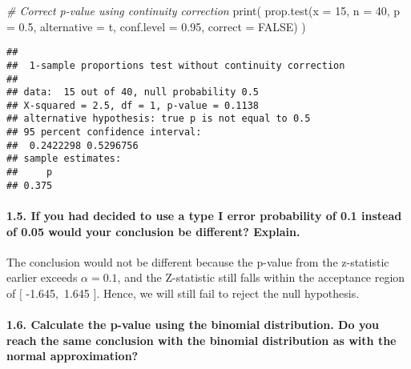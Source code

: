 \documentclass[
]{article}
\newenvironment{Shaded}{\begin{snugshade}}{\end{snugshade}}
\newcommand{\AttributeTok}[1]{\textcolor[rgb]{0.77,0.63,0.00}{#1}}
\newcommand{\CommentTok}[1]{\textcolor[rgb]{0.56,0.35,0.01}{\textit{#1}}}
\newcommand{\ConstantTok}[1]{\textcolor[rgb]{0.00,0.00,0.00}{#1}}
\newcommand{\DecValTok}[1]{\textcolor[rgb]{0.00,0.00,0.81}{#1}}
\newcommand{\FloatTok}[1]{\textcolor[rgb]{0.00,0.00,0.81}{#1}}
\newcommand{\FunctionTok}[1]{\textcolor[rgb]{0.00,0.00,0.00}{#1}}
\newcommand{\NormalTok}[1]{#1}
\newcommand{\StringTok}[1]{\textcolor[rgb]{0.31,0.60,0.02}{#1}}
\begin{document}
\begin{Shaded}
\begin{Highlighting}[]
\CommentTok{\# Correct p{-}value using continuity correction}
\FunctionTok{print}\NormalTok{(}
  \FunctionTok{prop.test}\NormalTok{(}\AttributeTok{x =} \DecValTok{15}\NormalTok{, }\AttributeTok{n =} \DecValTok{40}\NormalTok{, }\AttributeTok{p =} \FloatTok{0.5}\NormalTok{, }\AttributeTok{alternative =} \StringTok{\textquotesingle{}t\textquotesingle{}}\NormalTok{, }\AttributeTok{conf.level =} \FloatTok{0.95}\NormalTok{, }\AttributeTok{correct =} \ConstantTok{FALSE}\NormalTok{)}
\NormalTok{)}
\end{Highlighting}
\end{Shaded}

\begin{verbatim}
## 
##  1-sample proportions test without continuity correction
## 
## data:  15 out of 40, null probability 0.5
## X-squared = 2.5, df = 1, p-value = 0.1138
## alternative hypothesis: true p is not equal to 0.5
## 95 percent confidence interval:
##  0.2422298 0.5296756
## sample estimates:
##     p 
## 0.375
\end{verbatim}

\hypertarget{if-you-had-decided-to-use-a-type-i-error-probability-of-0.1-instead-of-0.05-would-your-conclusion-be-different-explain.}{%
\paragraph{1.5. If you had decided to use a type I error probability of
0.1 instead of 0.05 would your conclusion be different?
Explain.}\label{if-you-had-decided-to-use-a-type-i-error-probability-of-0.1-instead-of-0.05-would-your-conclusion-be-different-explain.}}

The conclusion would not be different because the p-value from the
z-statistic earlier exceeds \(\alpha = 0.1\), and the Z-statistic still
falls within the acceptance region of \([\) -1.645\(,\) 1.645 \(]\).
Hence, we will still fail to reject the null hypothesis.

\hypertarget{calculate-the-p-value-using-the-binomial-distribution.-do-you-reach-the-same-conclusion-with-the-binomial-distribution-as-with-the-normal-approximation}{%
\paragraph{1.6. Calculate the p-value using the binomial distribution.
Do you reach the same conclusion with the binomial distribution as with
the normal
approximation?}\label{calculate-the-p-value-using-the-binomial-distribution.-do-you-reach-the-same-conclusion-with-the-binomial-distribution-as-with-the-normal-approximation}}
\end{document}
